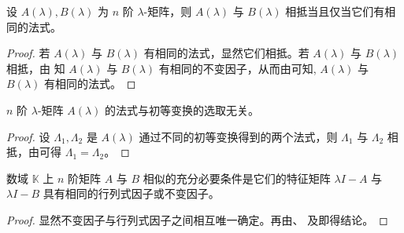 \documentclass[../../main.tex]{subfiles}%
\begin{document}
\begin{corollary}\label{corollary:相抵当且仅当它们有相同的法式}
设 $A(\lambda), B(\lambda)$ 为 $n$ 阶 $\lambda$-矩阵，则 $A(\lambda)$ 与 $B(\lambda)$ 相抵当且仅当它们有相同的法式。
\end{corollary}
\begin{proof}

若 $A(\lambda)$ 与 $B(\lambda)$ 有相同的法式，显然它们相抵。若 $A(\lambda)$ 与 $B(\lambda)$ 相抵，由 知 $A(\lambda)$ 与 $B(\lambda)$ 有相同的不变因子，从而由可知, $A(\lambda)$ 与 $B(\lambda)$ 有相同的法式。

\end{proof}

\begin{corollary}\label{corollary:矩阵法式与初等变换的选取无关}
$n$ 阶 $\lambda$-矩阵 $A(\lambda)$ 的法式与初等变换的选取无关。
\end{corollary}
\begin{proof}

设 $\varLambda_1, \varLambda_2$ 是 $A(\lambda)$ 通过不同的初等变换得到的两个法式，则 $\varLambda_1$ 与 $\varLambda_2$ 相抵，由可得 $\varLambda_1 = \varLambda_2$。

\end{proof}

\begin{theorem}\label{theorem:矩阵相似关于不变因子和行列式因子的充要条件}
数域 $\mathbb{K}$ 上 $n$ 阶矩阵 $A$ 与 $B$ 相似的充分必要条件是它们的特征矩阵 $\lambda I - A$ 与 $\lambda I - B$ 具有相同的行列式因子或不变因子。
\end{theorem}
\begin{proof}

显然不变因子与行列式因子之间相互唯一确定。再由、 及即得结论。

\end{proof}
\end{document}
